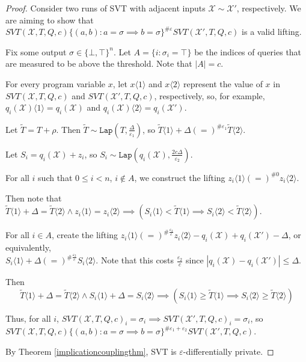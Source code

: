 \documentclass[12pt]{article}
\newcommand{\brangle}[1]{\langle#1 \rangle}
\newcommand{\Lap}{\texttt{Lap}}
\theoremstyle{definition}
\begin{document}
\begin{proof}
    Consider two runs of SVT with adjacent inputs $\mathcal{X}\sim\mathcal{X}'$, respectively. We are aiming to show that $SVT(\mathcal{X}, T, Q, c)\{(a, b): a=\sigma \implies b=\sigma\}^{\#\varepsilon}SVT(\mathcal{X}', T, Q, c)$ is a valid lifting. 

    Fix some output $\sigma \in \{\bot, \top\}^n$. Let $A = \{i:\sigma_i = \top\}$ be the indices of queries that are measured to be above the threshold. Note that $|A| = c$. 
    
    For every program variable $x$, let $x\brangle{1}$ and $x\brangle{2}$ represent the value of $x$ in $SVT(\mathcal{X}, T, Q, c)$ and $SVT(\mathcal{X}', T, Q, c)$, respectively, so, for example, $q_i(\mathcal{X})\brangle{1} = q_i(\mathcal{X})$ and $q_i(\mathcal{X})\brangle{2} = q_i(\mathcal{X}')$. 

    Let $\tilde{T}=T + \rho$. Then $\tilde{T} \sim \Lap(T, \frac{\Delta}{\varepsilon_1})$, so $\tilde{T}\brangle{1} +\Delta (=)^{\#\varepsilon_1}\tilde{T}\brangle{2}$. 

    Let $S_i = q_i(\mathcal{X}) + z_i$, so $S_i \sim\Lap(q_i(\mathcal{X}), \frac{2c\Delta}{\varepsilon_2})$.

    For all $i$ such that $0\leq i < n$, $i\notin A$, we construct the lifting $z_i\brangle{1} (=)^{\#0}z_i\brangle{2}$. 

    Then note that $\tilde{T}\brangle{1}+\Delta = \tilde{T}\brangle{2}\land z_i\brangle{1} = z_i \brangle{2} \implies (S_i\brangle{1} < \tilde{T}\brangle{1} \implies S_i\brangle{2} < \tilde{T}\brangle{2} )$.

    For all $i\in A$, create the lifting $z_i\brangle{1}(=)^{\#\frac{\varepsilon_2}{c}}z_i\brangle{2} - q_i(\mathcal{X})+q_i(\mathcal{X}')-\Delta$, or equivalently, \\$S_i\brangle{1} +\Delta (=)^{\#\frac{\varepsilon_2}{c}} S_i\brangle{2}$. Note that this costs $\frac{\varepsilon_2}{c}$ since $|q_i(\mathcal{X})-q_i(\mathcal{X}')|\leq \Delta$.

    Then \[\tilde{T}\brangle{1} +\Delta = \tilde{T}\brangle{2} \land S_i\brangle{1} + \Delta = S_i\brangle{2} \implies (S_i\brangle{1} \geq \tilde{T}\brangle{1} \implies S_i\brangle{2} \geq \tilde{T}\brangle{2})\]

    Thus, for all $i$, $SVT(\mathcal{X}, T, Q, c)_i = \sigma_i \implies SVT(\mathcal{X}', T, Q, c)_i = \sigma_i$, so $SVT(\mathcal{X}, T, Q, c)\{(a, b): a=\sigma \implies b=\sigma\}^{\#\varepsilon_1+\varepsilon_2}SVT(\mathcal{X}', T, Q, c)$.

    By Theorem \ref{implicationcouplingthm}, SVT is $\varepsilon$-differentially private. 
\end{proof}
\end{document}

